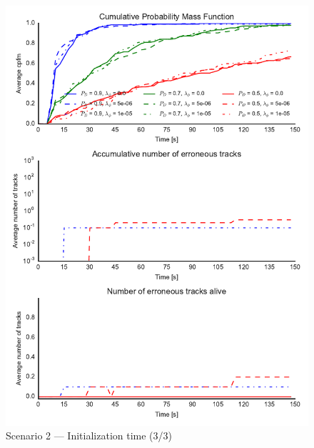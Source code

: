 \begin{figure}
\centering
\includegraphics{Figures/plots/Scenario2_Init-Time(3-3).pdf}
\caption{Scenario 2 --- Initialization time (3/3)}\label{fig:init2_time_3-3}
\end{figure}

